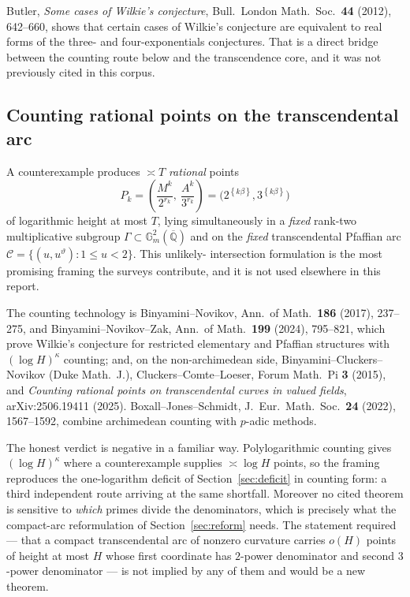\documentclass[11pt,oneside]{article}
\theoremstyle{definition}
\theoremstyle{remark}
\newcommand{\Abar}{\overline{\mathbb Q}}
\newcommand{\thetaq}{\vartheta}
\newcommand{\fract}[1]{\left\{#1\right\}}
\newcommand{\Qbar}{\Abar}
\begin{document}
Butler, \emph{Some cases of Wilkie's conjecture}, Bull.\ London Math.\ Soc.\ \textbf{44}
(2012), 642--660, shows that certain cases of Wilkie's conjecture are equivalent to real forms
of the three- and four-exponentials conjectures.  That is a direct bridge between the counting
route below and the transcendence core, and it was not previously cited in this corpus.

\subsection{Counting rational points on the transcendental arc}

A counterexample produces $\asymp T$ \emph{rational} points
\[
  P_k=\left(\frac{M^k}{2^{r_k}},\ \frac{A^k}{3^{r_k}}\right)
   =\bigl(2^{\fract{k\beta}},3^{\fract{k\beta}}\bigr)
\]
of logarithmic height at most $T$, lying simultaneously in a \emph{fixed} rank-two
multiplicative subgroup $\Gamma\subset\mathbb G_m^2(\Qbar)$ and on the \emph{fixed}
transcendental Pfaffian arc $\mathcal C=\{(u,u^{\thetaq}):1\le u<2\}$.  This unlikely-
intersection formulation is the most promising framing the surveys contribute, and it is not
used elsewhere in this report.

The counting technology is Binyamini--Novikov, Ann.\ of Math.\ \textbf{186} (2017), 237--275,
and Binyamini--Novikov--Zak, Ann.\ of Math.\ \textbf{199} (2024), 795--821, which prove
Wilkie's conjecture for restricted elementary and Pfaffian structures with $(\log H)^\kappa$
counting; and, on the non-archimedean side, Binyamini--Cluckers--Novikov (Duke Math.\ J.),
Cluckers--Comte--Loeser, Forum Math.\ Pi \textbf{3} (2015), and \emph{Counting rational points
on transcendental curves in valued fields}, arXiv:2506.19411 (2025).  Boxall--Jones--Schmidt,
J.\ Eur.\ Math.\ Soc.\ \textbf{24} (2022), 1567--1592, combine archimedean counting with
$p$-adic methods.

The honest verdict is negative in a familiar way.  Polylogarithmic counting gives
$(\log H)^\kappa$ where a counterexample supplies $\asymp\log H$ points, so the framing
reproduces the one-logarithm deficit of Section~\ref{sec:deficit} in counting form: a third
independent route arriving at the same shortfall.  Moreover no cited theorem is sensitive to
\emph{which} primes divide the denominators, which is precisely what the compact-arc
reformulation of Section~\ref{sec:reform} needs.  The statement required --- that a compact
transcendental arc of nonzero curvature carries $o(H)$ points of height at most $H$ whose first
coordinate has $2$-power denominator and second $3$-power denominator --- is not implied by any
of them and would be a new theorem.
\end{document}
